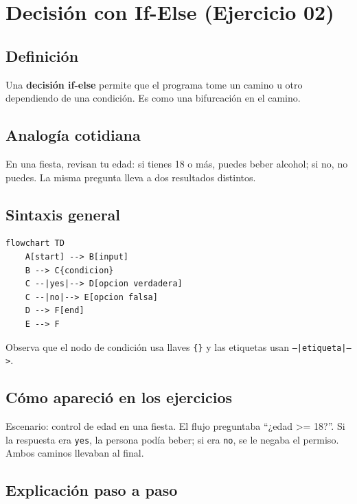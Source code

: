 \documentclass[12pt]{article}
\begin{document}
\newpage

\section{Decisión con If-Else (Ejercicio 02)}

\subsection{Definición}

Una \textbf{decisión if-else} permite que el programa tome un camino u otro dependiendo de una condición. Es como una bifurcación en el camino.

\subsection{Analogía cotidiana}

En una fiesta, revisan tu edad: si tienes 18 o más, puedes beber alcohol; si no, no puedes. La misma pregunta lleva a dos resultados distintos.

\subsection{Sintaxis general}

\begin{lstlisting}[style=mermaidstyle]
flowchart TD
    A[start] --> B[input]
    B --> C{condicion}
    C --|yes|--> D[opcion verdadera]
    C --|no|--> E[opcion falsa]
    D --> F[end]
    E --> F
\end{lstlisting}

Observa que el nodo de condición usa llaves \texttt{\{\}} y las etiquetas usan \texttt{--|etiqueta|-->}.

\subsection{Cómo apareció en los ejercicios}

Escenario: control de edad en una fiesta. El flujo preguntaba ``¿edad >= 18?''. Si la respuesta era \texttt{yes}, la persona podía beber; si era \texttt{no}, se le negaba el permiso. Ambos caminos llevaban al final.

\subsection{Explicación paso a paso}
\end{document}

